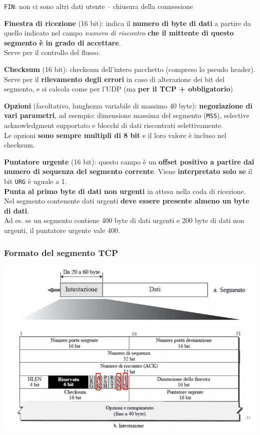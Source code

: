 \documentclass[10pt]{article}
\begin{document}
\begin{list}{}{}
\begin{list}{}{}
	\item \texttt{FIN}: non ci sono altri dati utente -- chiusura della connessione
	\end{list}
\item \textbf{Finestra di ricezione} (16 bit): indica il \textbf{numero di byte di dati} a partire da quello indicato nel campo \textit{numero di riscontro} \textbf{che il mittente di questo segmento è in grado di accettare}.\\Serve per il controllo del flusso.
\item \textbf{Checksum} (16 bit): checksum dell'intero pacchetto (compreso lo pseudo header).\\Serve per il \textbf{rilevamento degli errori} in caso di alterazione dei bit del segmento, e si calcola come per l'UDP (ma \textbf{per il TCP + obbligatorio})
\item \textbf{Opzioni} (facoltativo, lunghezza variabile di massimo 40 byte): \textbf{negoziazione di vari parametri}, ad esempio: dimensione massima del segmento (\texttt{MSS}), selective acknowledgment supportato e blocchi di dati riscontrati selettivamente.\\Le opzioni \textbf{sono sempre multipli di 8 bit} e il loro valore è incluso nel checksum.
\item \textbf{Puntatore urgente} (16 bit): questo campo è un \textbf{offset positivo a partire dal numero di sequenza del segmento corrente}. Viene \textbf{interpretato solo se} il bit \texttt{URG} è uguale a 1.\\\textbf{Punta al primo byte di dati non urgenti} in attesa nella coda di ricezione. Nel segmento contenente dati urgenti \textbf{deve essere presente almeno un byte di dati}.\\
Ad es. se un segmento contiene 400 byte di dati urgenti e 200 byte di dati non urgenti, il puntatore urgente vale 400.
\end{list}
\pagebreak
\subsubsection{Formato del segmento TCP}
\begin{center}
\includegraphics[scale=0.60]{formatosegmentotcp.png}
\end{center}
\end{document}
